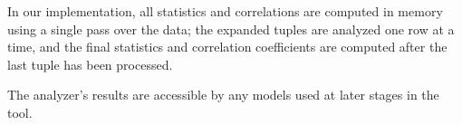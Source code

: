 In our implementation, all statistics and correlations are computed in memory using a single pass over the data; the expanded tuples are analyzed one row at a time, and the final statistics and correlation coefficients are computed after the last tuple has been processed. 

The analyzer's results are accessible by any models used at later stages in the tool.
